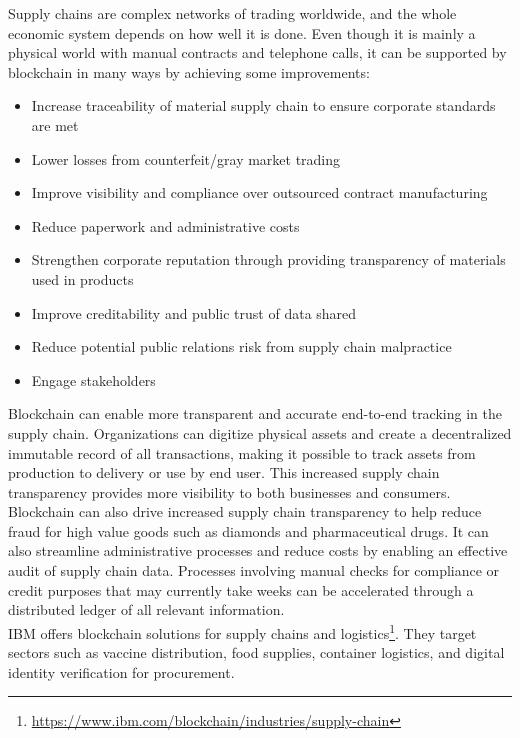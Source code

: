 \documentclass[10pt]{article}
\begin{document}
\begin{multicols}{2}
Supply chains are complex networks of trading worldwide, and the whole economic system depends on how well it is done. Even though it is mainly a physical world with manual contracts and telephone calls, it can be supported by blockchain in many ways by achieving some improvements:

\begin{itemize}
	\item Increase traceability of material supply chain to ensure corporate standards are met
	\item Lower losses from counterfeit/gray market trading
	\item Improve visibility and compliance over outsourced contract manufacturing
	\item Reduce paperwork and administrative costs
	\item Strengthen corporate reputation through providing transparency of materials used in products
	\item Improve creditability and public trust of data shared
	\item Reduce potential public relations risk from supply chain malpractice
	\item Engage stakeholders
\end{itemize}

Blockchain can enable more transparent and accurate end-to-end tracking in the supply chain. Organizations can digitize physical assets and create a decentralized immutable record of all transactions, making it possible to track assets from production to delivery or use by end user. This increased supply chain transparency provides more visibility to both businesses and consumers.\\

Blockchain can also drive increased supply chain transparency to help reduce fraud for high value goods such as diamonds and pharmaceutical drugs. It can also streamline administrative processes and reduce costs by enabling an effective audit of supply chain data. Processes involving manual checks for compliance or credit purposes that may currently take weeks can be accelerated through a distributed ledger of all relevant information.\\

IBM offers blockchain solutions for supply chains and logistics\footnote{\url{https://www.ibm.com/blockchain/industries/supply-chain}}. They target sectors such as vaccine distribution, food supplies, container logistics, and digital identity verification for procurement.


\end{multicols}
\end{document}
